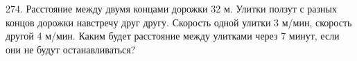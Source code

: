 274. Расстояние между двумя концами дорожки 32 м. Улитки ползут с разных концов дорожки навстречу друг другу. Скорость одной улитки 3 м/мин, скорость другой 4 м/мин. Каким будет расстояние между улитками через 7 минут, если они не будут останавливаться?\\
